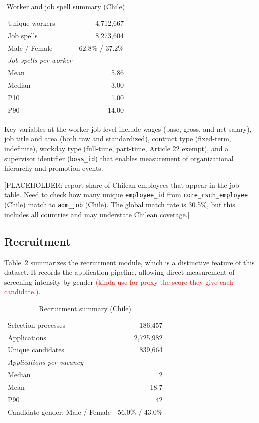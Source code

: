 \documentclass[11pt]{article}
\begin{document}
\begin{table}[h]
\centering
\caption{Worker and job spell summary (Chile)}
\label{tab:workers}
\begin{tabular}{lr}
\hline
Unique workers           & 4,712,667 \\
Job spells               & 8,273,604 \\
Male / Female            & 62.8\% / 37.2\% \\
\hline
\textit{Job spells per worker} & \\
\quad Mean               & 5.86 \\
\quad Median             & 3.00 \\
\quad P10                & 1.00 \\
\quad P90                & 14.00 \\
\hline
\end{tabular}
\end{table}

Key variables at the worker-job level include wages (base, gross, and net salary), job title and area (both raw and standardized), contract type (fixed-term, indefinite), workday type (full-time, part-time, Article 22 exempt), and a supervisor identifier (\texttt{boss\_id}) that enables measurement of organizational hierarchy and promotion events.

[PLACEHOLDER: report share of Chilean employees that appear in the job table. Need to check how many unique \texttt{employee\_id} from \texttt{core\_rsch\_employee} (Chile) match to \texttt{adm\_job} (Chile). The global match rate is 30.5\%, but this includes all countries and may understate Chilean coverage.]

\subsection{Recruitment}

Table~\ref{tab:recruit} summarizes the recruitment module, which is a distinctive feature of this dataset. It records the application pipeline, allowing direct measurement of screening intensity by gender \textcolor{red}{(kinda use for proxy the score they give each candidate.)}.

\begin{table}[h]
\centering
\caption{Recruitment summary (Chile)}
\label{tab:recruit}
\begin{tabular}{lr}
\hline
Selection processes       & 186,457 \\
Applications              & 2,725,982 \\
Unique candidates         & 839,664 \\
\hline
\textit{Applications per vacancy} & \\
\quad Median              & 2 \\
\quad Mean                & 18.7 \\
\quad P90                 & 42 \\
\hline
Candidate gender: Male / Female & 56.0\% / 43.0\% \\
\hline
\end{tabular}
\end{table}
\end{document}
